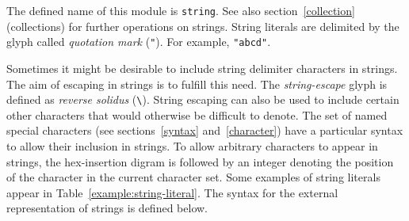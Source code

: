 \label{string}
\begin{optDefinition}
The defined name of this module is {\tt string}.  See also
section~\ref{collection} (collections) for further operations on
strings.
%
%
String literals are
delimited by the glyph called {\em quotation mark\/} (\verb+"+).  For
example, \verb+"abcd"+.

Sometimes it might be desirable to include string delimiter characters
in strings.  The aim of escaping in strings is to fulfill this need.  The {\em
string-escape\/} glyph is
defined as {\em reverse solidus\/} (\verb+\+).  String escaping can also
be used to include certain other characters that would otherwise be
difficult to denote.  The set of named special characters (see
sections~\ref{syntax} and~\ref{character}) have a particular syntax to
allow their inclusion in strings.  To allow arbitrary characters to
appear in strings, the hex-insertion digram is followed by an integer
denoting the position of the character in the current character set.
Some examples of string literals appear in
Table~\ref{example:string-literal}.  The syntax for the external
representation of strings is defined below.
%
\Syntax
\label{string-syntax}
\newbox\stringSyntax
\begingroup

\def\a{\string\a}
\def\b{\string\b}
\def\d{\string\d}
\def\f{\string\f}
\def\l{\string\l}
\def\n{\string\n}
\def\r{\string\r}
\def\t{\string\t}
\def\v{\string\v}
\def\x{\string\x}
\def\'{\string\'}
\def\"{\string\"}
\def\\{\string\\}


\end{optDefinition}
